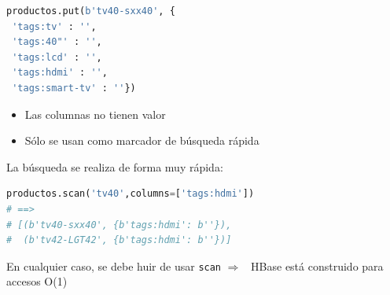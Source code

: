 \documentclass[14pt]{beamer}
\newcommand{\ra}{{\color{blue} $\Rightarrow${}~{}}}
\begin{document}
\begin{frame}
\framebreak

\begin{lstlisting}[language=python]
productos.put(b'tv40-sxx40', {
 'tags:tv' : '',
 'tags:40"' : '',
 'tags:lcd' : '',
 'tags:hdmi' : '',
 'tags:smart-tv' : ''})
\end{lstlisting}

\begin{itemize}
\item Las columnas no tienen valor
\item Sólo se usan como marcador de búsqueda rápida
\end{itemize}

\framebreak

La búsqueda se realiza de forma muy rápida:

\begin{lstlisting}[language=python]
productos.scan('tv40',columns=['tags:hdmi'])
# ==>
# [(b'tv40-sxx40', {b'tags:hdmi': b''}),
#  (b'tv42-LGT42', {b'tags:hdmi': b''})]
\end{lstlisting}





\begin{alertblock}{}
  En cualquier caso, se debe huir de usar {\tt scan} \ra{} HBase está
  construido para accesos O(1)
\end{alertblock}
\end{frame}
\end{document}
